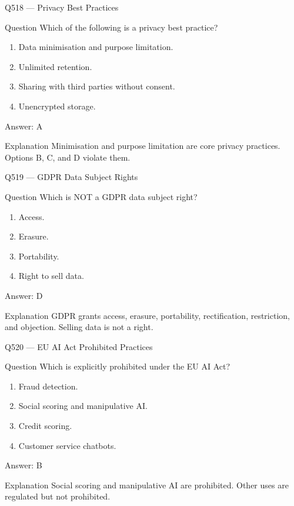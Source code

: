 \documentclass[aspectratio=169,8pt]{beamer}
\begin{document}
	\begin{frame}{Q518 --- Privacy Best Practices}
		\begin{block}{Question}
			Which of the following is a privacy best practice?
			\begin{enumerate}
				\item Data minimisation and purpose limitation.
				\item Unlimited retention.
				\item Sharing with third parties without consent.
				\item Unencrypted storage.
			\end{enumerate}
		\end{block}
		\begin{exampleblock}{Answer: A}\end{exampleblock}
		\begin{block}{Explanation}
			Minimisation and purpose limitation are core privacy practices. Options B, C, and D violate them.
		\end{block}
	\end{frame}
	
	\begin{frame}{Q519 --- GDPR Data Subject Rights}
		\begin{block}{Question}
			Which is NOT a GDPR data subject right?
			\begin{enumerate}
				\item Access.
				\item Erasure.
				\item Portability.
				\item Right to sell data.
			\end{enumerate}
		\end{block}
		\begin{exampleblock}{Answer: D}\end{exampleblock}
		\begin{block}{Explanation}
			GDPR grants access, erasure, portability, rectification, restriction, and objection. Selling data is not a right.
		\end{block}
	\end{frame}
	
	\begin{frame}{Q520 --- EU AI Act Prohibited Practices}
		\begin{block}{Question}
			Which is explicitly prohibited under the EU AI Act?
			\begin{enumerate}
				\item Fraud detection.
				\item Social scoring and manipulative AI.
				\item Credit scoring.
				\item Customer service chatbots.
			\end{enumerate}
		\end{block}
		\begin{exampleblock}{Answer: B}\end{exampleblock}
		\begin{block}{Explanation}
			Social scoring and manipulative AI are prohibited. Other uses are regulated but not prohibited.
		\end{block}
	\end{frame}
	
\end{document}
